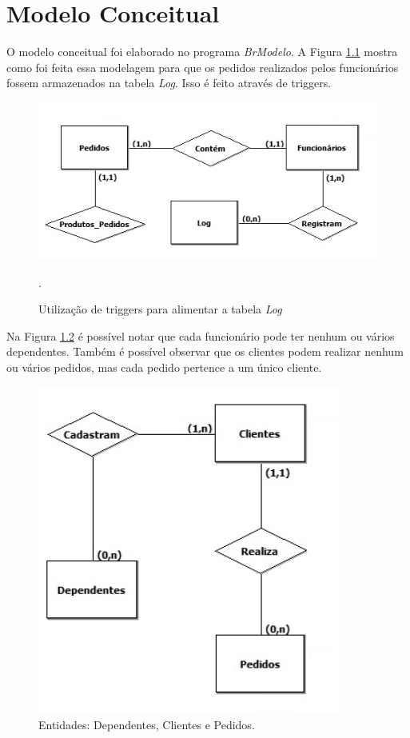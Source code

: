 \documentclass[
	12pt,				%
	openright,			%
	oneside,			%
	a4paper,			%
	chapter=TITLE,		%
	section=TITLE,		%
	english,			%
	brazil				%
	]{abntex2}
\begin{document}
\chapter{Modelo Conceitual}
    O modelo conceitual foi elaborado no programa \textit{BrModelo}. A Figura \ref{mc01} 
    mostra como foi feita essa modelagem para que os pedidos realizados pelos funcionários fossem 
    armazenados na tabela \textit{Log}. Isso é feito através de triggers.
    
    \begin{figure}[h]
         \centering
         \includegraphics[width=15cm,keepaspectratio]{Imgs/MC_01}
         \caption{Utilização de triggers para alimentar a tabela \textit{Log}}.
         \label{mc01}
    \end{figure}    

    \newpage
    
    Na Figura \ref{mc_02} é possível notar que cada funcionário pode ter
    nenhum ou vários dependentes. Também é possível observar que os clientes podem 
    realizar nenhum ou vários pedidos, mas cada pedido pertence a um único cliente.
    \begin{figure}[h]
         \centering
         \includegraphics[width=10cm,keepaspectratio]{Imgs/MC_02}
         \caption{Entidades: Dependentes, Clientes e Pedidos.}
         \label{mc_02}
    \end{figure}
\end{document}
